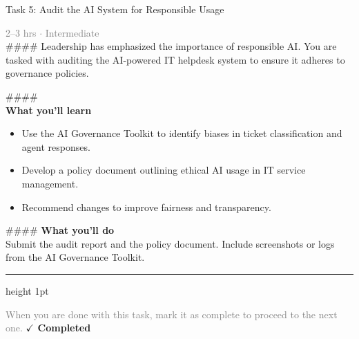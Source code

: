 \documentclass[10pt,a4paper]{article}
\begin{document}
\begin{taskbox}{Task 5: Audit the AI System for Responsible Usage}

    {\small \textcolor{gray}{2--3 hrs $\cdot$ Intermediate}}\\[12pt]

    \#\#\#\#   
Leadership has emphasized the importance of responsible AI. You are tasked with auditing the AI-powered IT helpdesk system to ensure it adheres to governance policies.  

\#\#\#\# \\[10pt]
\vspace{8pt}
{\large \textbf{\textcolor{brandLight}{What you'll learn}}}\\[4pt]  
\begin{itemize}
    \item Use the AI Governance Toolkit to identify biases in ticket classification and agent responses.  
    \item Develop a policy document outlining ethical AI usage in IT service management.  
    \item Recommend changes to improve fairness and transparency.  
\end{itemize}

\#\#\#\# \vspace{8pt}
{\large \textbf{\textcolor{brandLight}{What you'll do}}}\\[4pt]  
Submit the audit report and the policy document. Include screenshots or logs from the AI Governance Toolkit.\par

    \vspace{16pt}

    \textcolor{cardBorder}{\hrule height 1pt}\vspace{8pt}

    \small \textcolor{gray}{When you are done with this task, mark it as complete to proceed to the next one.} \hfill \textbf{\textcolor{brandDark}{$\checkmark$ Completed}}

\end{taskbox}
\end{document}
